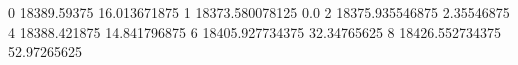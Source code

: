 0 18389.59375 16.013671875
1 18373.580078125 0.0
2 18375.935546875 2.35546875
4 18388.421875 14.841796875
6 18405.927734375 32.34765625
8 18426.552734375 52.97265625
